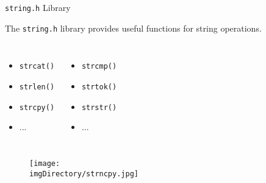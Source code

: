 \documentclass[compress]{beamer}
\begin{document}
\begin{slide}
	\begin{block}{\texttt{string.h} Library}

	The \texttt{string.h} library provides useful functions for string operations.

	\begin{columns}
	\begin{itemize}
	\item[] \texttt{strcat()}
	\item[] \texttt{strlen()}
	\item[] \texttt{strcpy()}
	\item[] ...
	\end{itemize}
	\begin{itemize}
	\item[] \texttt{strcmp()}
	\item[] \texttt{strtok()}
	\item[] \texttt{strstr()}
	\item[] ...
	\end{itemize}
	\end{columns}

	\end{block}
\end{slide}

\begin{slide}
	\begin{figure}
	\texttt{[image: \\imgDirectory/strncpy.jpg]}
	\end{figure}
\end{slide}
\end{document}

